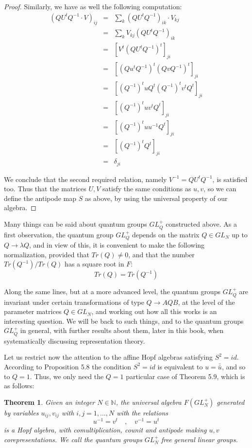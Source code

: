 \documentclass[12pt]{amsbook}
\newtheorem{theorem}{Theorem}[chapter]
\begin{document}
\begin{proof}
Similarly, we have as well the following computation:
\begin{eqnarray*}
(QU^tQ^{-1}\cdot V)_{ij}
&=&\sum_k(QU^tQ^{-1})_{ik}\cdot V_{kj}\\
&=&\sum_kV_{kj}(QU^tQ^{-1})_{ik}\\
&=&[V^t(QU^tQ^{-1})^t]_{ji}\\
&=&[(Qu^tQ^{-1})^t(QvQ^{-1})^t]_{ji}\\
&=&[(Q^{-1})^tuQ^t(Q^{-1})^tv^tQ^t]_{ji}\\
&=&[(Q^{-1})^tuv^tQ^t]_{ji}\\
&=&[(Q^{-1})^tuu^{-1}Q^t]_{ji}\\
&=&[(Q^{-1})^tQ^t]_{ji}\\
&=&\delta_{ji}
\end{eqnarray*}

We conclude that the second required relation, namely $V^{-1}=QU^tQ^{-1}$, is satisfied too. Thus that the matrices $U,V$ satisfy the same conditions as $u,v$, so we can define the antipode map $S$ as above, by using the universal property of our algebra.
\end{proof}

Many things can be said about quantum groups $GL_Q^+$ constructed above. As a first observation, the quantum group $GL_Q^+$ depends on the matrix $Q\in GL_N$ up to $Q\to\lambda Q$, and in view of this, it is convenient to make the following normalization, provided that $Tr(Q)\neq0$, and that the number $Tr(Q^{-1})/Tr(Q)$ has a square root in $F$:
$$Tr(Q)=Tr(Q^{-1})$$

Along the same lines, but at a more advanced level, the quantum groups $GL_Q^+$ are invariant under certain transformations of type $Q\to AQB$, at the level of the parameter matrices $Q\in GL_N$, and working out how all this works is an interesting question. We will be back to such things, and to the quantum groups $GL_Q^+$ in general, with further results about them, later in this book, when systematically discussing representation theory.

\bigskip

Let us restrict now the attention to the affine Hopf algebras satisfying $S^2=id$. According to Proposition 5.8 the condition $S^2=id$ is equivalent to $u=\bar{\bar{u}}$, and so to $Q=1$. Thus, we only need the $Q=1$ particular case of Theorem 5.9, which is as follows:

\begin{theorem}
Given an integer $N\in\mathbb N$, the universal algebra $F(GL_N^+)$ generated by variables $u_{ij},v_{ij}$ with $i,j=1,\ldots,N$ with the relations
$$u^{-1}=v^t\quad,\quad v^{-1}=u^t$$
is a Hopf algebra, with comultiplication, counit and antipode making $u,v$ corepresentations. We call the quantum groups $GL_N^+$ free general linear groups.
\end{theorem}
\end{document}
